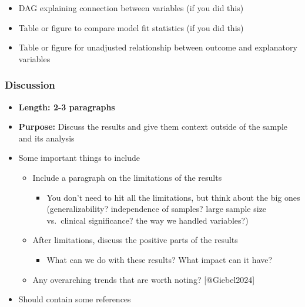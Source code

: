 \documentclass[
  letterpaper,
  DIV=11,
  numbers=noendperiod]{scrartcl}
\providecommand{\tightlist}{%
  \setlength{\itemsep}{0pt}\setlength{\parskip}{0pt}}\usepackage{longtable,booktabs,array}
\begin{document}
\begin{itemize}
\begin{itemize}
    \begin{itemize}
    \tightlist
    \item
      DAG explaining connection between variables (if you did this)
    \item
      Table or figure to compare model fit statistics (if you did this)
    \item
      Table or figure for unadjusted relationship between outcome and
      explanatory variables
    \end{itemize}
  \end{itemize}
\end{itemize}

\hypertarget{discussion}{%
\subsubsection{Discussion}\label{discussion}}

\begin{itemize}
\tightlist
\item
  \textbf{Length: 2-3 paragraphs}
\item
  \textbf{Purpose:} Discuss the results and give them context outside of
  the sample and its analysis
\item
  Some important things to include

  \begin{itemize}
  \tightlist
  \item
    Include a paragraph on the limitations of the results

    \begin{itemize}
    \tightlist
    \item
      You don't need to hit all the limitations, but think about the big
      ones (generalizability? independence of samples? large sample size
      vs.~clinical significance? the way we handled variables?)
    \end{itemize}
  \item
    After limitations, discuss the positive parts of the results

    \begin{itemize}
    \tightlist
    \item
      What can we do with these results? What impact can it have?
    \end{itemize}
  \item
    Any overarching trends that are worth noting? {[}@Giebel2024{]}
  \end{itemize}
\item
  Should contain some references
\end{itemize}
\end{document}
